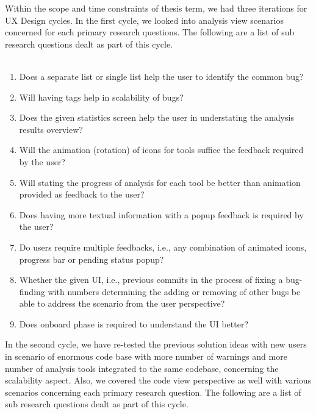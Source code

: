 Within the scope and time constraints of thesis term, we had three iterations for UX Design cycles. In the first cycle, we looked into analysis view scenarios concerned for each primary research questions. The following are a list of sub research questions dealt as part of this cycle. \\ \\
\clearpage
\begin{enumerate}
	\item Does a separate list or single list help the user to identify the common bug?
	\item Will having tags help in scalability of bugs?
	\item Does the given statistics screen help the user in understating the analysis results overview?
	\item Will the animation (rotation) of icons for tools suffice the feedback required by the user?
	\item Will stating the progress of analysis for each tool be better than animation provided as feedback to the user?
	\item Does having more textual information with a popup feedback is required by the user?
	\item Do users require multiple feedbacks, i.e., any combination of animated icons, progress bar or pending status popup?
	\item Whether the given UI, i.e., previous commits in the process of fixing a bug-finding with numbers determining the adding or removing of other bugs be able to address the scenario from the user perspective? 
	\item Does onboard phase is required to understand the UI better? \\
\end{enumerate}

In the second cycle, we have re-tested the previous solution ideas with new users in scenario of enormous code base with more number of warnings and more number of analysis tools integrated to the same codebase, concerning the scalability aspect. Also, we covered the code view perspective as well with various scenarios concerning each primary research question. The following are a list of sub research questions dealt as part of this cycle.\\ \\ 

